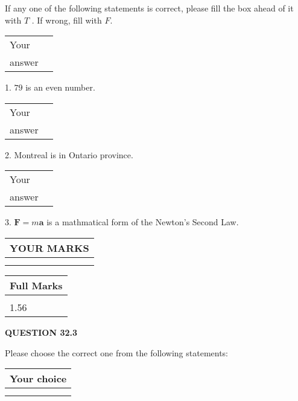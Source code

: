\documentclass[12pt]{article}
\begin{document}
  
If any one of the following statements is correct, please fill the box ahead of it with $T$ .
If wrong, fill with $F$.
 
\noindent\begin{tabular}{|l|l|}\hline Your&\hspace{.2in} \\ answer&\hspace{.2in} \\ \hline \end{tabular}
1. $ %
79$ is an  %
even number.
 
\noindent\begin{tabular}{|l|l|}\hline Your&\hspace{.2in} \\ answer&\hspace{.2in} \\ \hline \end{tabular}
2.  %
Montreal is in  %
Ontario province.
 
\noindent\begin{tabular}{|l|l|}\hline Your&\hspace{.2in} \\ answer&\hspace{.2in} \\ \hline \end{tabular}
3.  %
$\mathbf{F}=m\mathbf{a}$ is a mathmatical form of
the Newton's Second Law.
 

 
\vspace{0.3in}
  
\vspace{0.2in}
  
\noindent\begin{tabular}{|l|}
\hline
 YOUR MARKS  \\
\hline
 \\ 
 \\ 
\hline
\end{tabular}
\hspace{0.05in} \begin{tabular}{|l|}
\hline
 Full Marks  \\
\hline
 \\ 
1.56 \\
\hline
\end{tabular}
{\textbf{\Large{QUESTION
32.3 
}}}
  
  
Please choose the correct one from the following statements:
  
  
\noindent\hspace{3.0in} \begin{tabular}{|l|}
\hline
Your choice \\
\hline
 \\ 
 \\ 
\hline
\end{tabular}
  
\end{document}
